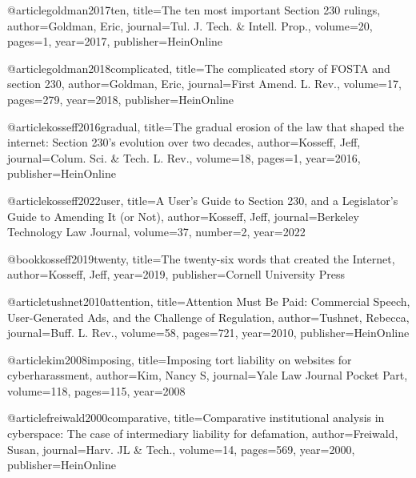 

@article{goldman2017ten,
  title={The ten most important Section 230 rulings},
  author={Goldman, Eric},
  journal={Tul. J. Tech. \& Intell. Prop.},
  volume={20},
  pages={1},
  year={2017},
  publisher={HeinOnline}
}

@article{goldman2018complicated,
  title={The complicated story of FOSTA and section 230},
  author={Goldman, Eric},
  journal={First Amend. L. Rev.},
  volume={17},
  pages={279},
  year={2018},
  publisher={HeinOnline}
}

@article{kosseff2016gradual,
  title={The gradual erosion of the law that shaped the internet: Section 230's evolution over two decades},
  author={Kosseff, Jeff},
  journal={Colum. Sci. \& Tech. L. Rev.},
  volume={18},
  pages={1},
  year={2016},
  publisher={HeinOnline}
}

@article{kosseff2022user,
  title={A User's Guide to Section 230, and a Legislator's Guide to Amending It (or Not)},
  author={Kosseff, Jeff},
  journal={Berkeley Technology Law Journal},
  volume={37},
  number={2},
  year={2022}
}

@book{kosseff2019twenty,
  title={The twenty-six words that created the Internet},
  author={Kosseff, Jeff},
  year={2019},
  publisher={Cornell University Press}
}

@article{tushnet2010attention,
  title={Attention Must Be Paid: Commercial Speech, User-Generated Ads, and the Challenge of Regulation},
  author={Tushnet, Rebecca},
  journal={Buff. L. Rev.},
  volume={58},
  pages={721},
  year={2010},
  publisher={HeinOnline}
}

@article{kim2008imposing,
  title={Imposing tort liability on websites for cyberharassment},
  author={Kim, Nancy S},
  journal={Yale Law Journal Pocket Part},
  volume={118},
  pages={115},
  year={2008}
}

@article{freiwald2000comparative,
  title={Comparative institutional analysis in cyberspace: The case of intermediary liability for defamation},
  author={Freiwald, Susan},
  journal={Harv. JL \& Tech.},
  volume={14},
  pages={569},
  year={2000},
  publisher={HeinOnline}
}

